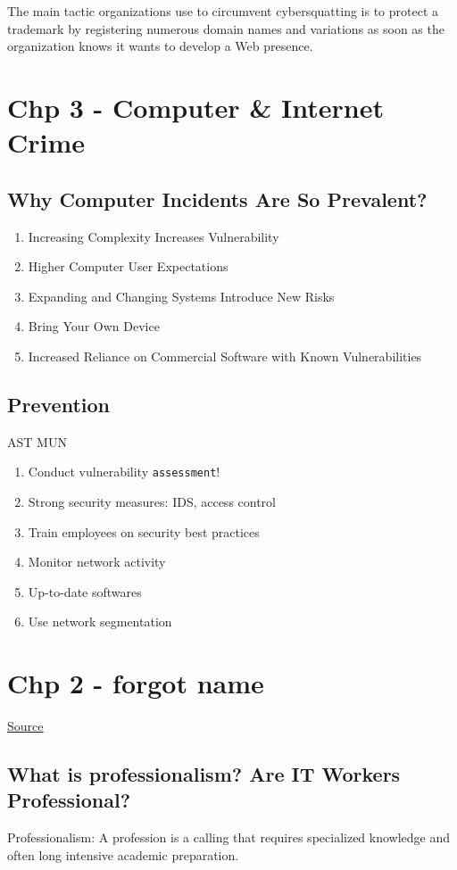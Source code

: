 \documentclass[11pt]{article}
\begin{document}
The main tactic organizations use to circumvent cybersquatting is to protect a trademark by registering numerous domain names and variations as soon as the organization knows it wants to develop a Web presence.
\section{Chp 3 - Computer \& Internet Crime}
\label{sec:orgab91cc3}
\subsection{Why Computer Incidents Are So Prevalent?}
\label{sec:org919dfa4}
\begin{enumerate}
\item Increasing Complexity Increases Vulnerability
\item Higher Computer User Expectations
\item Expanding and Changing Systems Introduce New Risks
\item Bring Your Own Device
\item Increased Reliance on Commercial Software with Known Vulnerabilities
\end{enumerate}
\subsection{Prevention}
\label{sec:org5c5c1f8}
AST MUN
\begin{enumerate}
\item Conduct vulnerability \texttt{assessment}!
\item Strong security measures: IDS, access control
\item Train employees on security best practices
\item Monitor network activity
\item Up-to-date softwares
\item Use network segmentation
\end{enumerate}
\section{Chp 2 - forgot name}
\label{sec:org486252c}
\href{https://docs.google.com/document/d/1TBkps7-DH7TuaZY-rTWYsV1zgnPnBVwf8500eHXIdLg/edit?usp=sharing}{Source}
\subsection{What is professionalism? Are IT Workers Professional?}
\label{sec:org5a95246}
Professionalism: A profession is a calling that requires specialized knowledge and often long intensive academic preparation.
\end{document}
